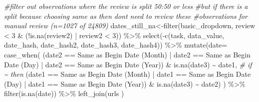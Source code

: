 \documentclass[
]{article}
\newenvironment{Shaded}{\begin{snugshade}}{\end{snugshade}}
\newcommand{\AttributeTok}[1]{\textcolor[rgb]{0.77,0.63,0.00}{#1}}
\newcommand{\CommentTok}[1]{\textcolor[rgb]{0.56,0.35,0.01}{\textit{#1}}}
\newcommand{\DecValTok}[1]{\textcolor[rgb]{0.00,0.00,0.81}{#1}}
\newcommand{\FunctionTok}[1]{\textcolor[rgb]{0.00,0.00,0.00}{#1}}
\newcommand{\NormalTok}[1]{#1}
\newcommand{\OtherTok}[1]{\textcolor[rgb]{0.56,0.35,0.01}{#1}}
\newcommand{\SpecialCharTok}[1]{\textcolor[rgb]{0.00,0.00,0.00}{#1}}
\newcommand{\StringTok}[1]{\textcolor[rgb]{0.31,0.60,0.02}{#1}}
\begin{document}
\begin{Shaded}
\begin{Highlighting}[]
\CommentTok{\#filter out observations where the review is split 50:50 or less}
\CommentTok{\#but if there is a split because choosing \textquotesingle{}same as\textquotesingle{} then don\textquotesingle{}t need to review these }
\CommentTok{\#observations for manual review (n=1027 of 24809)}
\NormalTok{dates\_still\_na}\OtherTok{\textless{}{-}}\FunctionTok{filter}\NormalTok{(basic\_dropdown, review }\SpecialCharTok{\textless{}} \DecValTok{3} \SpecialCharTok{\&}\NormalTok{ (}\SpecialCharTok{!}\FunctionTok{is.na}\NormalTok{(review2) }\SpecialCharTok{|}\NormalTok{ review2 }\SpecialCharTok{\textless{}} \DecValTok{3}\NormalTok{)) }\SpecialCharTok{\%\textgreater{}\%}
  \FunctionTok{select}\NormalTok{(}\SpecialCharTok{{-}}\FunctionTok{c}\NormalTok{(task, data\_value, date\_hash, date\_hash2, date\_hash3, date\_hash4)) }\SpecialCharTok{\%\textgreater{}\%}
  \FunctionTok{mutate}\NormalTok{(}\AttributeTok{date=} \FunctionTok{case\_when}\NormalTok{( }
\NormalTok{    (date2 }\SpecialCharTok{==} \StringTok{\textquotesingle{}Same as Begin Date (Month)\textquotesingle{}} \SpecialCharTok{|}\NormalTok{ date2 }\SpecialCharTok{==} \StringTok{\textquotesingle{}Same as Begin Date (Day)\textquotesingle{}} \SpecialCharTok{|}\NormalTok{ date2 }\SpecialCharTok{==} \StringTok{\textquotesingle{}Same as Begin Date (Year)\textquotesingle{}}\NormalTok{) }\SpecialCharTok{\&} \FunctionTok{is.na}\NormalTok{(date3)   }\SpecialCharTok{\textasciitilde{}}\NormalTok{ date1, }\CommentTok{\# if \textasciitilde{} then }
\NormalTok{    (date1 }\SpecialCharTok{==} \StringTok{\textquotesingle{}Same as Begin Date (Month)\textquotesingle{}} \SpecialCharTok{|}\NormalTok{ date1 }\SpecialCharTok{==} \StringTok{\textquotesingle{}Same as Begin Date (Day)\textquotesingle{}} \SpecialCharTok{|}\NormalTok{ date1 }\SpecialCharTok{==} \StringTok{\textquotesingle{}Same as Begin Date (Year)\textquotesingle{}}\NormalTok{) }\SpecialCharTok{\&} \FunctionTok{is.na}\NormalTok{(date3)   }\SpecialCharTok{\textasciitilde{}}\NormalTok{ date2)}
\NormalTok{  )  }\SpecialCharTok{\%\textgreater{}\%} 
   \FunctionTok{filter}\NormalTok{(}\FunctionTok{is.na}\NormalTok{(date))  }\SpecialCharTok{\%\textgreater{}\%} 
                 \FunctionTok{left\_join}\NormalTok{(urls )}



\end{Highlighting}
\end{Shaded}
\end{document}
